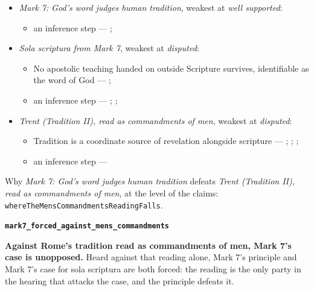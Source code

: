 \documentclass[11pt]{article}
\begin{document}
\begin{itemize}
\item \emph{Mark 7: God's word judges human tradition}, weakest at \emph{well supported}:
\begin{itemize}
\item an inference step --- \cite[Vatican II (1965), Dei Verbum 10]{tanner-decrees-1990}; \cite[IV.x.23]{calvin-institutes-1960}
\end{itemize}
\item \emph{Sola scriptura from Mark 7}, weakest at \emph{disputed}:
\begin{itemize}
\item No apostolic teaching handed on outside Scripture survives, identifiable as the word of God --- \cite[506]{whitaker-disputation-1849}; \cite[I.6]{westminster-confession-1647}
\item an inference step --- \cite{geiselmann-meaning-of-tradition-1966}; \cite[Vatican I (1870), Pastor Aeternus, ch. 4]{tanner-decrees-1990}; \cite{florovsky-bible-church-tradition-1972}
\end{itemize}
\item \emph{Trent (Tradition II), read as commandments of men}, weakest at \emph{disputed}:
\begin{itemize}
\item Tradition is a coordinate source of revelation alongside scripture --- \cite[Trent, Session IV (1546), Decree on Sacred Books and Traditions]{tanner-decrees-1990}; \cite{mathison-shape-sola-scriptura-2001}; \cite{geiselmann-meaning-of-tradition-1966}; \cite{congar-tradition-and-traditions-1966}
\item an inference step --- \cite[IV.x.23]{calvin-institutes-1960}
\end{itemize}
\end{itemize}
\noindent Why \emph{Mark 7: God's word judges human tradition} defeats \emph{Trent (Tradition II), read as commandments of men}, at the level of the claims: \texttt{where\allowbreak{}The\allowbreak{}Mens\allowbreak{}Commandments\allowbreak{}Reading\allowbreak{}Falls}.
\par\medskip\noindent\textbf{\texttt{mark7\_\allowbreak{}forced\_\allowbreak{}against\_\allowbreak{}mens\_\allowbreak{}commandments}}\par\nobreak\noindent
\textbf{Against Rome's tradition read as commandments of men, Mark 7's case is unopposed.} Heard against that reading alone, Mark 7's principle and Mark 7's case for sola scriptura are both forced: the reading is the only party in the hearing that attacks the case, and the principle defeats it.
\end{document}
